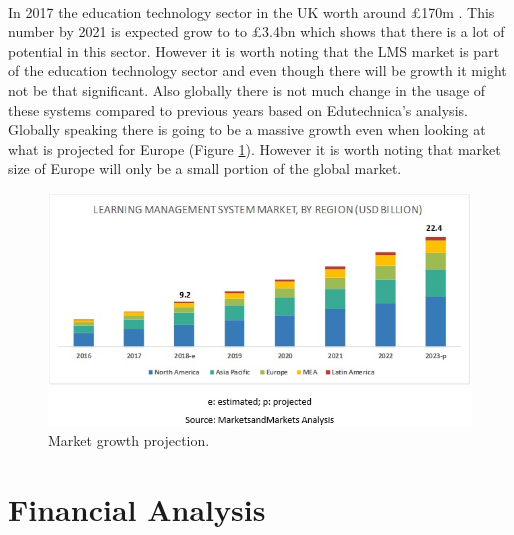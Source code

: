 \documentclass[]{article}
\begin{document}
\paragraph{}
In 2017 the education technology sector in the UK worth around £170m \cite{Government-Strategy}. This number by 2021 is expected grow to to £3.4bn which shows that there is a lot of potential in this sector. However it is worth noting that the LMS market is part of the education technology sector and even though there will be growth it might not be that significant. Also globally there is not much change \cite{VLE-2020-IMG} in the usage of these systems compared to previous years based on Edutechnica's analysis. Globally speaking there is going to be a massive growth \cite{Markets-and-Markets} even when looking at what is projected for Europe (Figure \ref{fig:Markets-LMS}). However it is worth noting that market size of Europe will only be a small portion of the global market.

\begin{figure}
    \centering
    \includegraphics[width =1.2\linewidth]{learning-management-systems-market5.jpg}
    \caption{Market growth projection. \cite{Markets-and-Markets}}
    \label{fig:Markets-LMS}
\end{figure}

\newpage
\section{Financial Analysis}
\end{document}
